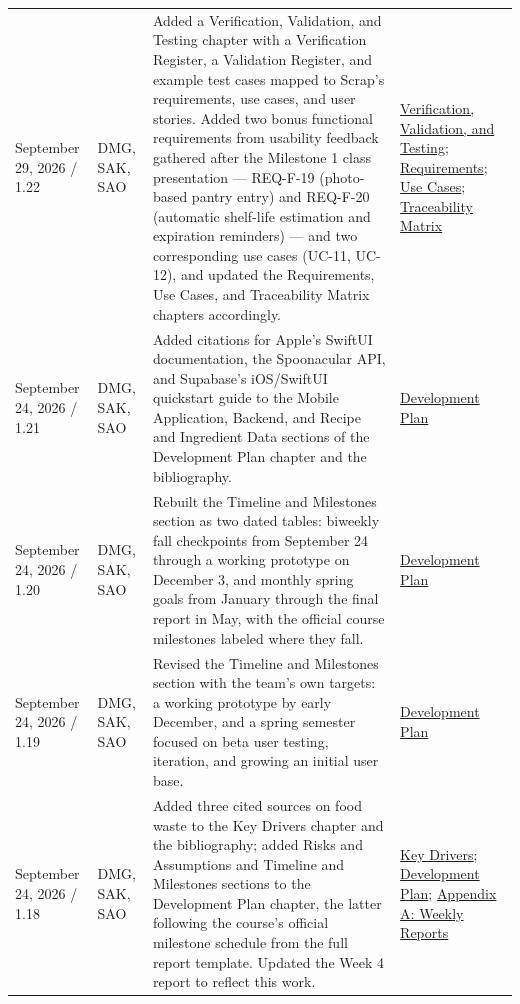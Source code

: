 \begin{tabularx}{\linewidth}{L{2.7cm}L{2.0cm}YL{2.4cm}}
September 29, 2026 / 1.22 & DMG, SAK, SAO & Added a Verification, Validation, and Testing chapter with a Verification Register, a Validation Register, and example test cases mapped to Scrap's requirements, use cases, and user stories. Added two bonus functional requirements from usability feedback gathered after the Milestone 1 class presentation --- REQ-F-19 (photo-based pantry entry) and REQ-F-20 (automatic shelf-life estimation and expiration reminders) --- and two corresponding use cases (UC-11, UC-12), and updated the Requirements, Use Cases, and Traceability Matrix chapters accordingly. & \hyperref[Chapter:VerificationValidationTesting]{Verification, Validation, and Testing}; \hyperref[Chapter:Requirements]{Requirements}; \hyperref[Chapter:UseCases]{Use Cases}; \hyperref[Chapter:Traceability]{Traceability Matrix}\\
September 24, 2026 / 1.21 & DMG, SAK, SAO & Added citations for Apple's SwiftUI documentation, the Spoonacular API, and Supabase's iOS/SwiftUI quickstart guide to the Mobile Application, Backend, and Recipe and Ingredient Data sections of the Development Plan chapter and the bibliography. & \hyperref[Chapter:DevelopmentPlan]{Development Plan}\\
September 24, 2026 / 1.20 & DMG, SAK, SAO & Rebuilt the Timeline and Milestones section as two dated tables: biweekly fall checkpoints from September 24 through a working prototype on December 3, and monthly spring goals from January through the final report in May, with the official course milestones labeled where they fall. & \hyperref[Chapter:DevelopmentPlan]{Development Plan}\\
September 24, 2026 / 1.19 & DMG, SAK, SAO & Revised the Timeline and Milestones section with the team's own targets: a working prototype by early December, and a spring semester focused on beta user testing, iteration, and growing an initial user base. & \hyperref[Chapter:DevelopmentPlan]{Development Plan}\\
September 24, 2026 / 1.18 & DMG, SAK, SAO & Added three cited sources on food waste to the Key Drivers chapter and the bibliography; added Risks and Assumptions and Timeline and Milestones sections to the Development Plan chapter, the latter following the course's official milestone schedule from the full report template. Updated the Week 4 report to reflect this work. & \hyperref[Chapter:KeyDrivers]{Key Drivers}; \hyperref[Chapter:DevelopmentPlan]{Development Plan}; \hyperref[Chapter:WeeklyReports]{Appendix A: Weekly Reports}\\

\end{tabularx}
